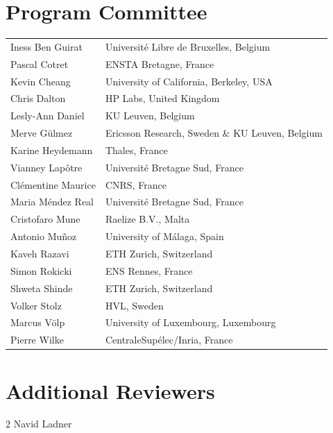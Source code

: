 \documentclass[runningheads]{llncs}
\begin{document}
\section*{Program Committee}
\begin{longtable}{p{}p{}}
Iness Ben Guirat     & Universit\'e Libre de Bruxelles, Belgium \\
Pascal Cotret        & ENSTA Bretagne, France \\
Kevin Cheang         & University of California, Berkeley, USA  \\
Chris Dalton         & HP Labs, United Kingdom \\
Lesly-Ann Daniel     & KU Leuven, Belgium \\
Merve G\"ulmez       & Ericsson Research, Sweden \& KU Leuven, Belgium \\
Karine Heydemann     & Thales, France \\
Vianney Lap\^otre    & Universit\'e Bretagne Sud, France \\
Cl\'ementine Maurice & CNRS, France \\
Maria M\'endez Real  & Universit\'e Bretagne Sud, France \\
Cristofaro Mune      & Raelize B.V., Malta \\
Antonio Mu\~noz      & University of M\'alaga, Spain \\
Kaveh Razavi         & ETH Zurich, Switzerland \\
Simon Rokicki        & ENS Rennes, France \\
Shweta Shinde        & ETH Zurich, Switzerland \\
Volker Stolz         & HVL, Sweden \\
Marcus V\"olp        & University of  Luxembourg, Luxembourg \\
Pierre Wilke         & CentraleSup\'elec/Inria, France \\
\end{longtable}

\section*{Additional Reviewers}
\begin{multicols}{2}
\noindent Navid Ladner \\
\end{multicols}

\tableofcontents

\mainmatter

\end{document}
